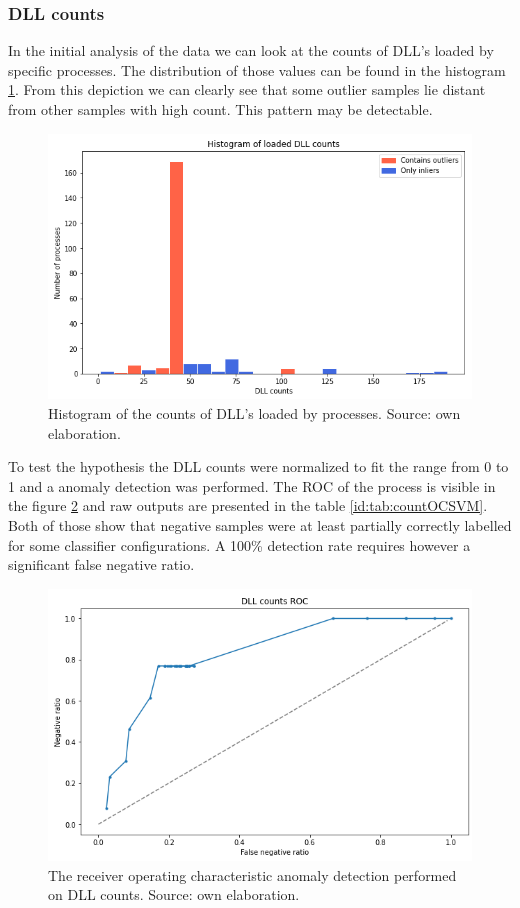 \documentclass[a4paper,twoside,12pt]{book}
\begin{document}
\subsubsection{DLL counts}
In the initial analysis of the data we can look at the counts of DLL's loaded by specific 
processes. The distribution of those values can be found in the histogram \ref{fig:dllCounts}. 
From this depiction we can clearly see that some outlier samples lie distant from other 
samples with high count. This pattern may be detectable. 


\begin{figure}
	\centering
	\includegraphics[scale=0.9]{images/DLLcounts}
	\caption{Histogram of the counts of DLL's loaded by processes. Source: own elaboration.}
	\label{fig:dllCounts}
 \end{figure}

To test the hypothesis the DLL counts were normalized to fit the range from 0 to 1 and a anomaly 
detection was performed. The ROC of the process is visible in the figure \ref{fig:DLLcountsROC} and
raw outputs are presented in the table \ref{id:tab:countOCSVM}. Both of those show that 
negative samples were at least partially correctly labelled for some classifier configurations. A 100\%
detection rate requires however a significant false negative ratio.

\begin{figure}
	\centering
	\includegraphics{images/DLLCountsROCKF}
	\caption{The receiver operating characteristic anomaly detection performed on DLL counts. Source: own elaboration.}
	\label{fig:DLLcountsROC}
\end{figure}
\end{document}
